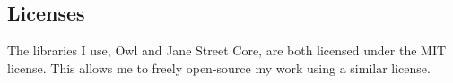 \subsection{Licenses}
			
The libraries I use, Owl and Jane Street Core, are both licensed under the MIT license. This allows me to freely open-source my work using a similar license.
